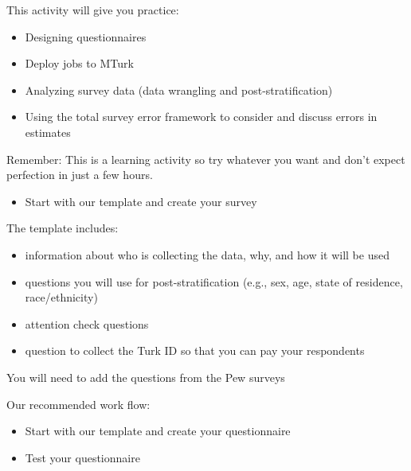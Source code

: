 \documentclass[aspectratio=169]{beamer}
\begin{document}
\begin{frame}

This activity will give you practice:
\begin{itemize}
\item Designing questionnaires
\pause
\item Deploy jobs to MTurk
\pause
\item Analyzing survey data (data wrangling and post-stratification)
\pause
\item Using the total survey error framework to consider and discuss errors in estimates
\pause
\end{itemize}

\vfill
Remember: This is a learning activity so try whatever you want and don't expect perfection in just a few hours.

\end{frame}
\begin{frame}

\begin{itemize}
\item Start with our template and create your survey
\end{itemize}

\end{frame}
\begin{frame}

The template includes:
\begin{itemize}
\item information about who is collecting the data, why, and how it will be used
\pause
\item questions you will use for post-stratification (e.g., sex, age, state of residence, race/ethnicity)
\pause
\item attention check questions
\pause
\item question to collect the Turk ID so that you can pay your respondents
\end{itemize}

\vfill
You will need to add the questions from the Pew surveys
\end{frame}
\begin{frame}

Our recommended work flow:
\begin{itemize}
\item Start with our template and create your questionnaire \pause
\item Test your questionnaire
\end{itemize}

\end{frame}
\end{document}
